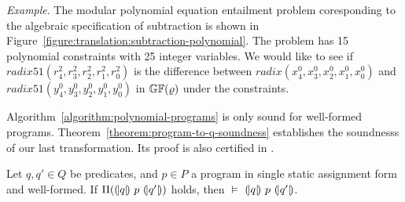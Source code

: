 \noindent
\emph{Example}.
The modular polynomial equation entailment problem coresponding to the
algebraic specification of subtraction is shown in
Figure~\ref{figure:translation:subtraction-polynomial}. The problem
has 15 polynomial constraints with 25 integer variables. We would like
to see if $\mathit{radix51}({r}^2_4, {r}^2_3, {r}^2_2,
{r}^2_1, {r}^2_0)$ is the difference between $\mathit{radix}({x}^0_4,
{x}^0_3, {x}^0_2, {x}^0_1, {x}^0_0)$ and $\mathit{radix51}({y}^0_4,
{y}^0_3, {y}^0_2, {y}^0_1, {y}^0_0)$ in $\mathbb{GF}(\varrho)$ under the
constraints. 



Algorithm~\ref{algorithm:polynomial-programs} is only sound for
well-formed programs. 
Theorem~\ref{theorem:program-to-q-soundness} establishes the
soundnesss of our last transformation. Its proof is also certified in
\coq. 
\begin{theorem}
  \label{theorem:program-to-q-soundness}
  Let $q, q' \in Q$ be predicates, and $p \in P$ a program in single
  static assignment form and well-formed. 
  If $\Pi({(\!|}{q}{|\!)}~{p}~{(\!|}{q'}{|\!)})$ holds, then
  $\models$ ${(\!|}{q}{|\!)}~{p}~{(\!|}{q'}{|\!)}$.
\end{theorem}

